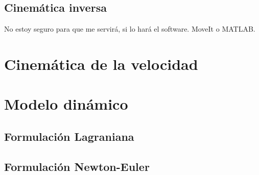 \subsection{Cinemática inversa}
No estoy seguro para que me servirá, si lo hará el software. MoveIt o MATLAB.

\section{Cinemática de la velocidad}


\section{Modelo dinámico}
\subsection{Formulación Lagraniana}
\subsection{Formulación Newton-Euler}